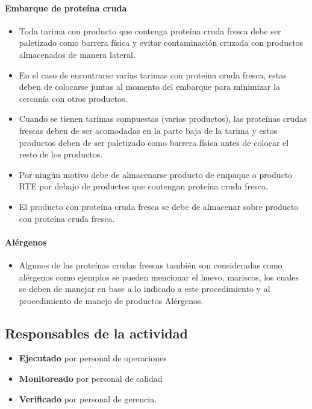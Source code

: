 \paragraph{Embarque de proteína cruda}

\begin{itemize}
	\item Toda tarima con producto que contenga proteína cruda fresca debe ser paletizado como barrera física y evitar contaminación cruzada con productos almacenados de manera lateral.
	\item En el caso de encontrarse varias tarimas con proteína cruda fresca, estas deben de colocarse juntas al momento del embarque para minimizar la cercanía con otros productos.
	\item Cuando se tienen tarimas compuestas (varios productos), las proteínas crudas frescas deben de ser acomodadas en la parte baja de la tarima y estos productos deben de ser paletizado como barrera física antes de colocar el resto de los productos.
	\item Por ningún motivo debe de almacenarse producto de empaque o producto RTE por debajo de productos que contengan proteína cruda fresca.
	\item El producto con proteína cruda fresca se debe de almacenar sobre producto con proteína cruda fresca.
\end{itemize}


\paragraph{Alérgenos}

\begin{itemize}
	\item Algunos de las proteínas crudas frescas también son consideradas como alérgenos como ejemplos se pueden mencionar el huevo, mariscos, los cuales se deben de manejar en base a lo indicado a este procedimiento y al procedimiento de manejo de productos Alérgenos.
\end{itemize}

\subsection{Responsables de la actividad}

\begin{itemize}
	\item \textbf{Ejecutado} por personal de operaciones
	\item \textbf{Monitoreado} por personal de calidad
	\item \textbf{Verificado} por personal de gerencia.
\end{itemize}

